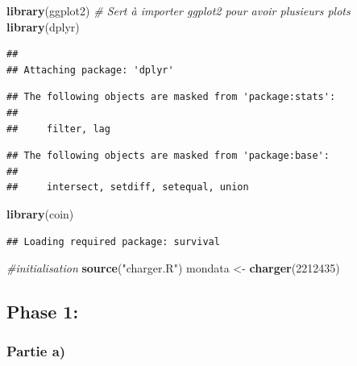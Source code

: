 \documentclass[
]{article}
\author{}
\date{\vspace{-2.5em}}
\newenvironment{Shaded}{\begin{snugshade}}{\end{snugshade}}
\newcommand{\CommentTok}[1]{\textcolor[rgb]{0.56,0.35,0.01}{\textit{#1}}}
\newcommand{\DecValTok}[1]{\textcolor[rgb]{0.00,0.00,0.81}{#1}}
\newcommand{\FunctionTok}[1]{\textcolor[rgb]{0.13,0.29,0.53}{\textbf{#1}}}
\newcommand{\NormalTok}[1]{#1}
\newcommand{\OtherTok}[1]{\textcolor[rgb]{0.56,0.35,0.01}{#1}}
\newcommand{\StringTok}[1]{\textcolor[rgb]{0.31,0.60,0.02}{#1}}
\begin{document}
\begin{Shaded}
\begin{Highlighting}[]
\FunctionTok{library}\NormalTok{(ggplot2) }\CommentTok{\# Sert à importer ggplot2 pour avoir plusieurs plots}
\FunctionTok{library}\NormalTok{(dplyr)}
\end{Highlighting}
\end{Shaded}

\begin{verbatim}
## 
## Attaching package: 'dplyr'
\end{verbatim}

\begin{verbatim}
## The following objects are masked from 'package:stats':
## 
##     filter, lag
\end{verbatim}

\begin{verbatim}
## The following objects are masked from 'package:base':
## 
##     intersect, setdiff, setequal, union
\end{verbatim}

\begin{Shaded}
\begin{Highlighting}[]
\FunctionTok{library}\NormalTok{(coin)}
\end{Highlighting}
\end{Shaded}

\begin{verbatim}
## Loading required package: survival
\end{verbatim}

\begin{Shaded}
\begin{Highlighting}[]
\CommentTok{\#initialisation}
\FunctionTok{source}\NormalTok{(}\StringTok{"charger.R"}\NormalTok{)}
\NormalTok{mondata }\OtherTok{\textless{}{-}} \FunctionTok{charger}\NormalTok{(}\DecValTok{2212435}\NormalTok{)}
\end{Highlighting}
\end{Shaded}

\hypertarget{phase-1}{%
\subsection{Phase 1:}\label{phase-1}}

\hypertarget{partie-a}{%
\subsubsection{Partie a)}\label{partie-a}}
\end{document}

